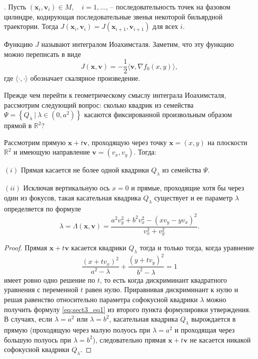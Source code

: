 \begin{theorem}{\normalfont{[7, с.~61]}}.
Пусть $(\mathbf{x}_i, \mathbf{v}_i) \in M, \quad i=1,\ldots$, -- последовательность точек на фазовом цилиндре, кодирующая последовательные звенья некоторой  бильярдной траектории. Тогда $J(\mathbf{x}_i, \mathbf{v}_i) =  J(\mathbf{x}_{i+1}, \mathbf{v}_{i+1})$ для всех $i$.
\label{th:sect3_th1}
\end{theorem}

Функцию $J$ называют интегралом Иоахимсталя. Заметим, что эту функцию можно переписать в виде 
$$J(\mathbf{x}, \mathbf{v}) = -\frac{1}{2}\langle\mathbf{v}, \nabla f_0(x, y)\rangle,$$
где $\langle\cdot, \cdot\rangle$ обозначает скалярное произведение. 

Прежде чем перейти к геометрическому смыслу интеграла Иоахимсталя, рассмотрим следующий вопрос: сколько квадрик из семейства $\Psi = \left\{ Q_{\lambda} \ |\ \lambda \in (0, a^2) \right\}$ касаются   фиксированной произвольным образом прямой в $\mathbb{R}^2$?

\begin{statement}
Рассмотрим прямую $\mathbf{x}+t\mathbf{v}$, проходящую через точку $\mathbf{x}= (x, y)$ на плоскости $\mathbb{R}^2$ и имеющую направление $\mathbf{v}=(v_x, v_y)$. Тогда:

$(i)$ Прямая касается не более одной квадрики $Q_\lambda$ из семейства $\Psi$.

$(ii)$ Исключая вертикальную ось $x=0$ и прямые, проходящие хотя бы через один из фокусов,  такая касательная квадрика  $Q_\lambda$ существует и ее параметр $\lambda$ определяется по формуле 
\begin{equation}
\lambda = \Lambda(\mathbf{x}, \mathbf{v}) = \frac{a^2 v_y^2 + b^2v_x^2 - (x v_y-y v_x)^2}{v_x^2 + v_y^2}.
\label{eq:sect3_eq1}
\end{equation}

\end{statement}

\begin{proof}
Прямая $\mathbf{x} + t \mathbf{v}$ касается квадрики $Q_\lambda$ тогда и только тогда, когда уравнение
$$\frac{(x + t v_x)^2}{a^2-\lambda} + \frac{(y + t v_y)^2}{b^2-\lambda} = 1$$
имеет ровно одно решение по $t$, то есть когда дискриминант квадратного уравнения с переменной $t$  равен нулю. Приравнивая дискриминант к нулю и решая равенство относительно параметра софокусной квадрики $\lambda$ можно получить формулу \eqref{eq:sect3_eq1} из второго пункта формулировки утверждения. В случаях, если $\lambda = a^2$ или $\lambda = b^2$, касательная квадрика $Q_\lambda$ вырождается в прямую (проходящую через малую полуось при $\lambda = a^2$ и проходящая через большую полуось при $\lambda = b^2$), следовательно прямая $\mathbf{x}+ t\mathbf{v}$ не касается никакой софокусной квадрики $Q_\lambda$.
\end{proof}


